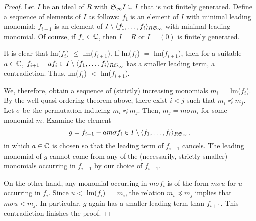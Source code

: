 \begin{proof}
Let $I$ be an ideal of $R$ with ${\frak S}_{\infty}I \subseteq I$
that is not finitely generated.  Define a sequence of elements of
$I$ as follows:  $f_1$ is an element of $I$ with minimal leading
monomial;  $f_{i+1}$ is an element of $I \setminus
\langle f_1,\ldots,f_i \rangle_{R{\frak S}_{\infty}}$ with minimal leading
monomial.  Of course, if $f_1 \in {\mathbb C}$, then $I = R$ or $I = (0)$
is finitely generated.

It is clear that lm($f_i$) $\leq$ lm($f_{i+1}$).  If lm($f_i$) $=$
lm($f_{i+1}$), then for a suitable $a \in {\mathbb C}$, $f_{i+1} - af_i \in
I \setminus \langle f_1,\ldots,f_i \rangle_{R{\frak S}_{\infty}}$ has a
smaller leading term, a contradiction.  Thus, lm($f_i$) $<$
lm($f_{i+1}$).

We, therefore, obtain a sequence of (strictly) increasing
monomials $m_i =$ lm($f_i$). By the well-quasi-ordering theorem
above, there exist $i < j$ such that $m_i \preceq m_j$.  Let
$\sigma$ be the permutation inducing $m_i \preceq m_j$.  Then,
$m_j = m \sigma m_i$ for some monomial $m$.  Examine the element
\[g = f_{i+1} - am \sigma f_{i} \in I \setminus \langle f_1,\ldots,f_i
\rangle_{R{\frak S}_{\infty}},\] in which $a \in {\mathbb C}$ is chosen so that
the leading term of $f_{i+1}$ cancels.  The leading monomial of
$g$ cannot come from any of the (necessarily, strictly smaller)
monomials occurring in $f_{i+1}$ by our choice of $f_{i+1}$.

On the other hand, any monomial occurring in $m \sigma f_{i}$ is
of the form $m \sigma u$ for $u$ occurring in $f_{i}$.  Since $u <
$ lm($f_i$) $= m_i$, the relation $m_i \preceq m_j$ implies that
$m \sigma u < m_j$.  In particular, $g$ again has a smaller
leading term than $f_{i+1}$.  This contradiction finishes the
proof.
\end{proof}
